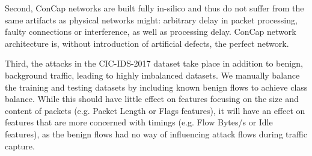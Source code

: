Second, ConCap networks are built fully in-silico and thus do not suffer from the same artifacts as physical networks might: arbitrary delay in packet processing, faulty connections or interference, as well as processing delay. ConCap network architecture is, without introduction of artificial defects, the perfect network.  

Third, the attacks in the CIC-IDS-2017 dataset take place in addition to benign, background traffic, leading to highly imbalanced datasets. We manually balance the training and testing datasets by including known benign flows to achieve class balance. While this should have little effect on features focusing on the size and content of packets (e.g. Packet Length or Flags features), it will have an effect on features that are more concerned with timings (e.g. Flow Bytes/s or Idle features), as the benign flows had no way of influencing attack flows during traffic capture. 


